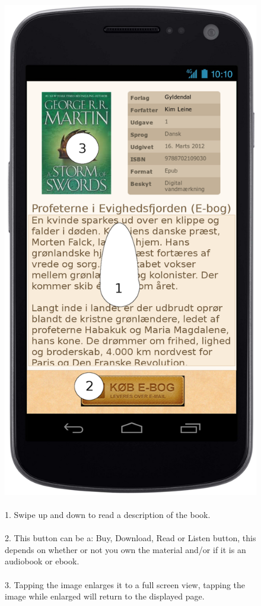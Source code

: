\documentclass[12pt]{article}
\begin{document}
\begin{figure}
\includegraphics[scale=0.7]{gnexinfodownloadogkoeb.png}
\caption{
\\
1. Swipe up and down to read a description of the book.\\\\
2. This button can be a: Buy, Download, Read or Listen button, this depends on whether or not you own the material and/or if it is an audiobook or ebook.\\\\
3. Tapping the image enlarges it to a full screen view, tapping the image while enlarged will return to the displayed page.
}
\label{Book information}
\end{figure}
\end{document}
